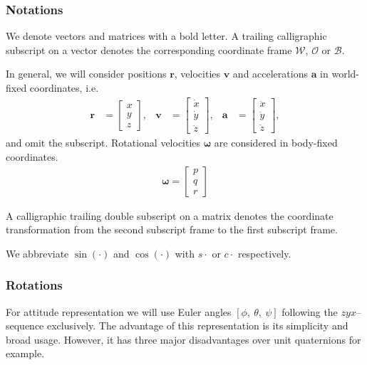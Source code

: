 \subsubsection{Notations}
We denote vectors and matrices with a bold letter. A trailing calligraphic subscript on a vector denotes the corresponding coordinate frame $\mathcal{W}$, $\mathcal{O}$ or $\mathcal{B}$. 

In general, we will consider positions $\mathbf{r}$, velocities $\mathbf{v}$ and accelerations $\mathbf{a}$ in world-fixed coordinates, i.e.
\begin{align}
\mathbf{r} &= \begin{bmatrix}
x \\ y \\ z
\end{bmatrix},
& \mathbf{v} &= \begin{bmatrix}
\dot{x} \\ \dot{y} \\ \dot{z}
\end{bmatrix},
& \mathbf{a} &= \begin{bmatrix}
\ddot{x} \\ \ddot{y} \\ \ddot{z}
\end{bmatrix},
\end{align}
and omit the subscript. Rotational velocities $\boldsymbol{\omega}$ are considered in body-fixed coordinates.
\begin{align}
\boldsymbol{\omega} = \begin{bmatrix}
p \\ q \\ r
\end{bmatrix}
\end{align}

A calligraphic trailing double subscript on a matrix denotes the coordinate transformation from the second subscript frame to the first subscript frame. 

We abbreviate $\sin(\cdot)$ and $\cos(\cdot)$ with $s \cdot$ or $c \cdot$ respectively.

\subsubsection{Rotations}
For attitude representation we will use Euler angles $[\phi,~\theta,~\psi]$ following the $zyx$--sequence exclusively. The advantage of this representation is its simplicity and broad usage. However, it has three major disadvantages over unit quaternions for example. 

